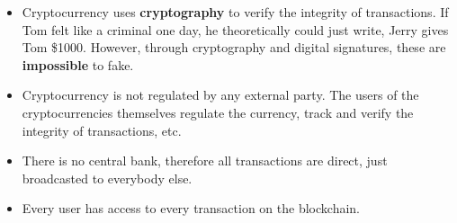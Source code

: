 \documentclass[../main.tex]{subfiles}
\begin{document}
\begin{itemize}
    \item Cryptocurrency uses \textbf{cryptography} to verify the integrity of transactions. If Tom felt like a criminal one day, he theoretically could just write, {\mono Jerry gives Tom \$1000}. However, through cryptography and digital signatures, these are \textbf{impossible} to fake.
    \item Cryptocurrency is not regulated by any external party. The users of the cryptocurrencies themselves regulate the currency, track and verify the integrity of transactions, etc.
    \item There is no central bank, therefore all transactions are direct, just broadcasted to everybody else.
    \item Every user has access to every transaction on the blockchain.
\end{itemize}
\end{document}
